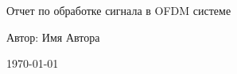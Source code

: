 \begin{titlepage}
\centering
{\Large Отчет по обработке сигнала в OFDM системе}

\vspace{2cm}

{\large Автор: Имя Автора}

\vspace{1cm}

{\large \today}
\end{titlepage}